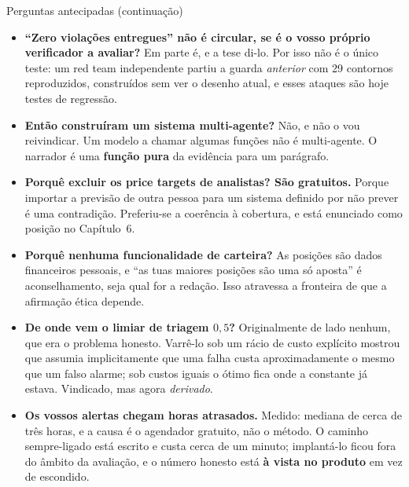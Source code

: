 \documentclass[aspectratio=169]{beamer}
\begin{document}
\begin{frame}{Perguntas antecipadas (continuação)}
\footnotesize
\begin{itemize}
  \item \textbf{``Zero violações entregues'' não é circular, se é o vosso próprio verificador
        a avaliar?} Em parte é, e a tese di-lo. Por isso não é o único teste: um red team
        independente partiu a guarda \emph{anterior} com 29 contornos reproduzidos, construídos
        sem ver o desenho atual, e esses ataques são hoje testes de regressão.
  \item \textbf{Então construíram um sistema multi-agente?} Não, e não o vou reivindicar. Um
        modelo a chamar algumas funções não é multi-agente. O narrador é uma \textbf{função
        pura} da evidência para um parágrafo.
  \item \textbf{Porquê excluir os price targets de analistas? São gratuitos.} Porque importar a
        previsão de outra pessoa para um sistema definido por não prever é uma contradição.
        Preferiu-se a coerência à cobertura, e está enunciado como posição no Capítulo~6.
  \item \textbf{Porquê nenhuma funcionalidade de carteira?} As posições são dados financeiros
        pessoais, e ``as tuas maiores posições são uma só aposta'' é aconselhamento, seja qual
        for a redação. Isso atravessa a fronteira de que a afirmação ética depende.
  \item \textbf{De onde vem o limiar de triagem $0{,}5$?} Originalmente de lado nenhum, que era
        o problema honesto. Varrê-lo sob um rácio de custo explícito mostrou que assumia
        implicitamente que uma falha custa aproximadamente o mesmo que um falso alarme; sob
        custos iguais o ótimo fica onde a constante já estava. Vindicado, mas agora \emph{derivado}.
  \item \textbf{Os vossos alertas chegam horas atrasados.} Medido: mediana de cerca de três
        horas, e a causa é o agendador gratuito, não o método. O caminho sempre-ligado está
        escrito e custa cerca de um minuto; implantá-lo ficou fora do âmbito da avaliação, e o
        número honesto está \textbf{à vista no produto} em vez de escondido.
\end{itemize}
\end{frame}
\end{document}

